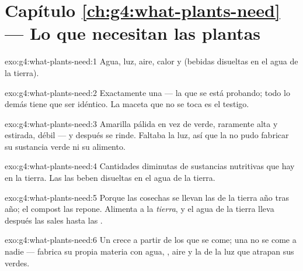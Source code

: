\section*{Capítulo \ref{ch:g4:what-plants-need} --- Lo que necesitan las plantas}

\begin{solution}{exo:g4:what-plants-need:1}
Agua, luz, aire, calor y  (bebidas disueltas en el agua
de la tierra).
\end{solution}

\begin{solution}{exo:g4:what-plants-need:2}
Exactamente una --- la que se está probando; todo lo demás tiene que
ser idéntico. La maceta que no se toca es el testigo.
\end{solution}

\begin{solution}{exo:g4:what-plants-need:3}
Amarilla pálida en vez de verde, raramente alta y estirada, débil ---
y después se rinde. Faltaba la luz, así que la  no pudo fabricar
su sustancia verde ni su alimento.
\end{solution}

\begin{solution}{exo:g4:what-plants-need:4}
Cantidades diminutas de sustancias nutritivas que hay en la tierra.
Las  las beben disueltas en el agua de la tierra.
\end{solution}

\begin{solution}{exo:g4:what-plants-need:5}
Porque las cosechas se llevan las  de la tierra año
tras año; el compost las repone. Alimenta a la \emph{tierra}, y el
agua de la tierra lleva después las sales hasta las .
\end{solution}

\begin{solution}{exo:g4:what-plants-need:6}
Un  crece a partir de los  que se come; una  no
se come a nadie --- fabrica su propia materia con agua, , aire y la  de la luz que atrapan sus  verdes.
\end{solution}

